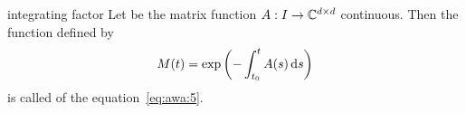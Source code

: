 \begin{Definition}{integrating factor}
    Let be the matrix function $A:I\to \mathbb C^{d\times d}$ continuous.  Then
  the function defined by
  \begin{gather}
    \label{eq:awa:7}
    M(t) = \exp\left(-\int_{t_0}^t A(s) \,\mathrm{d} s\right)
  \end{gather}
  is called  of the
  equation~\eqref{eq:awa:5}.
\end{Definition}